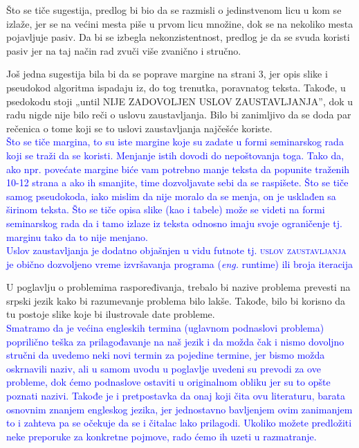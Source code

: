 \documentclass[a4paper]{report}
\newcommand{\odgovor}[1]{\textcolor{blue}{#1}}
\newcommand{\eng}[1]{(\textit{eng.} #1)}
\begin{document}
Što se tiče sugestija, predlog bi bio da se razmisli o jedinstvenom licu u kom se izlaže, jer se na većini mesta piše u prvom licu množine, dok se na nekoliko mesta pojavljuje pasiv. Da bi se izbegla nekonzistentnost, predlog je da se svuda koristi pasiv jer na taj način rad zvuči više zvanično i stručno. 

Još jedna sugestija bila bi da se poprave margine na strani 3, jer opis slike i pseudokod algoritma ispadaju iz, do tog trenutka, poravnatog teksta. Takođe, u psedokodu stoji „until NIJE ZADOVOLJEN USLOV ZAUSTAVLJANJA”, dok u radu nigde nije bilo reči o uslovu zaustavljanja. Bilo bi zanimljivo da se doda par rečenica o tome koji se to uslovi zaustavljanja najčešće koriste.\\
\odgovor{Što se tiče margina, to su iste margine koje su zadate u formi seminarskog rada koji se traži da se koristi. Menjanje istih dovodi do nepoštovanja toga. Tako da, ako npr. povećate margine biće vam potrebno manje teksta da popunite traženih 10-12 strana a ako ih smanjite, time dozvoljavate sebi da se raspišete. 
Što se tiče samog pseudokoda, iako mislim da nije moralo da se menja, on je usklađen sa širinom teksta. Što se tiče opisa slike (kao i tabele) može se videti na formi seminarskog rada da i tamo izlaze iz teksta odnosno imaju svoje ograničenje tj. marginu tako da to nije menjano.\\
Uslov zaustavljanja je dodatno objašnjen u vidu futnote tj. \textsc{uslov zaustavljanja} je obično dozvoljeno vreme izvršavanja programa \eng{runtime} ili broja iteracija\\}

U poglavlju o problemima raspoređivanja, trebalo bi nazive problema prevesti na srpski jezik kako bi razumevanje problema bilo lakše. Takođe, bilo bi korisno da tu postoje slike koje bi ilustrovale date probleme.\\
\odgovor{Smatramo da je većina engleskih termina (uglavnom podnaslovi problema) poprilično teška za prilagođavanje na naš jezik i da možda čak i nismo dovoljno stručni da uvedemo neki novi termin za pojedine termine, jer bismo možda oskrnavili naziv, ali u samom uvodu u poglavlje uvedeni su prevodi za ove probleme, dok ćemo podnaslove ostaviti u originalnom obliku jer su to opšte poznati nazivi. Takođe je i pretpostavka da onaj koji čita ovu literaturu, barata osnovnim znanjem engleskog jezika, jer jednostavno bavljenjem ovim zanimanjem to i zahteva pa se očekuje da se i čitalac lako prilagodi. Ukoliko možete predložiti neke preporuke za konkretne pojmove, rado ćemo ih uzeti u razmatranje.\\}
\end{document}
